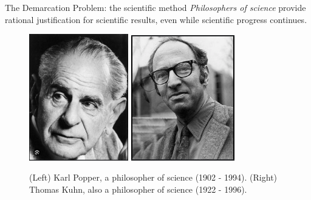 \documentclass{beamer}
\begin{document}
\begin{frame}{The Demarcation Problem: the scientific method}
\small
\textit{Philosophers of science} provide rational justification for scientific results, even while scientific progress continues. \\ \vspace{0.5cm}
\begin{figure}
\centering
\includegraphics[width=0.385\textwidth]{figures/popper.png}
\includegraphics[width=0.4\textwidth]{figures/kuhn.png}
\caption{\label{fig:phil} (Left) Karl Popper, a philosopher of science (1902 - 1994). (Right) Thomas Kuhn, also a philosopher of science (1922 - 1996).}
\end{figure}
\end{frame}
\end{document}
